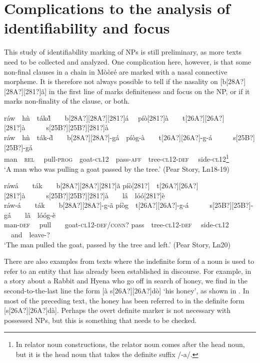\documentclass[output=paper]{langsci/langscibook}
\begin{document}
\section{Complications to the analysis of identifiability and focus}\label{sec:7}

This study of identifiability marking of NPs is still preliminary, as more texts need to be collected and analyzed. One complication here, however, is that some non-final clauses in a chain in Mòòré are marked with a nasal connective morpheme. It is therefore not always possible to tell if the nasality on [b[28A?][28A?][281?]\~{a}] in the first line of  marks definiteness and focus on the NP, or if it marks non-finality of the clause, or both.

\ea\label{ex:teo:57}
r\'{a}w\ \ h\`{n}\ \ t\'{a}k\`{d}\ \ \ \ b[28A?][28A?][281?]\'{a} \ \ p\'{i}\`{o}[281?]\`{a}\ \ \ \ t[26A?][26A?][281?]\`{a}\ \ \ \ \ \ s[25B?][25B?][281?]\`{a}\\
\gll r\'{a}w\ \ h\`{n}\ \ t\'{a}k-\`{d}\ \ \ \ b[28A?][28A?]-g\'{a}\ \ p\'{i}\`{o}g-\`{a}\ \ \ \ t[26A?][26A?]-g\nobreakdash-\'{a}\ \ \ \ \ \ s[25B?][25B?]-g\'{a}\\
man\ \ \textsc{rel \ \ }pull-\textsc{prog}\ \ goat-\textsc{cl12\ \ }pass\nobreakdash-\textsc{aff\ \ }tree\textsc{{}-cl12-def} \ \ side\textsc{{}-cl12}\footnote{In relator noun constructions, the relator noun comes after the head noun, but it is the head noun that takes the definite suffix /-a/.}\\
\glt ‘A man who was pulling a goat passed by the tree.’ (Pear Story, Ln18-19)
\z

\ea\label{ex:teo:58}
r\'{a}w\'{a}\ \ \ \ t\'{a}k\ \ \ \ b[28A?][28A?][281?]\~{a} p\'{i}\`{o}[281?]\ \ t[26A?][26A?][281?]\`{a}\ \ \ \ \ \ s[25B?][25B?][281?]\`{a}\ \ \ \ l\^{a}\ \ l\'{o}\'{o}[281?]\`{e}\\
\gll r\'{a}w\nobreakdash-\'{a}\ \ \ \ t\'{a}k\ \ \ \ b[28A?][28A?]-g-\~{a} p\'{i}\`{o}g\ \ t[26A?][26A?]-g\nobreakdash-\'{a}\ \ \ \ \ \ s[25B?][25B?]-g\'{a}\ \ \ \ l\^{a}\ \ l\'{o}\'{o}g-\`{e}
\\ 
man\nobreakdash-\textsc{def} \ \ pull\ \ \ \ goat-\textsc{cl12-}\textsc{def/conn?} pass\textsc{\ \ }tree\textsc{{}-cl12-def} \ \ side\textsc{{}-cl12} \ \ and\ \ leave-?\\
\glt ‘The man pulled the goat, passed by the tree and left.’ (Pear Story, Ln20)
\z

There are also examples from texts where the indefinite form of a noun is used to refer to an entity that has already been established in discourse. For example, in a story about a Rabbit and Hyena who go off in search of honey, we find in the second-to-the-last line the form [à s[26A?][26A?]dò] ‘his honey’, as shown in . In most of the preceding text, the honey has been referred to in the definite form [s[26A?][26A?]dà]. Perhaps the overt definite marker is not necessary with possessed NPs, but this is something that needs to be checked. 
\end{document}
